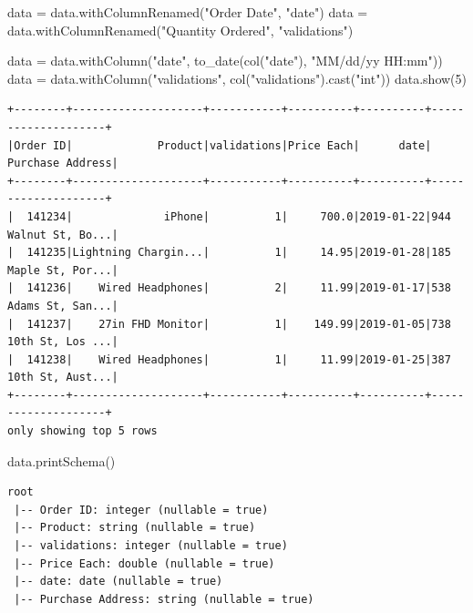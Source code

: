 \documentclass[
  letterpaper,
  DIV=11,
  numbers=noendperiod]{scrartcl}
\newenvironment{Shaded}{\begin{snugshade}}{\end{snugshade}}
\newcommand{\DecValTok}[1]{\textcolor[rgb]{0.68,0.00,0.00}{#1}}
\newcommand{\NormalTok}[1]{\textcolor[rgb]{0.00,0.23,0.31}{#1}}
\newcommand{\OperatorTok}[1]{\textcolor[rgb]{0.37,0.37,0.37}{#1}}
\newcommand{\StringTok}[1]{\textcolor[rgb]{0.13,0.47,0.30}{#1}}
\begin{document}
\begin{Shaded}
\begin{Highlighting}[]
\NormalTok{data }\OperatorTok{=}\NormalTok{ data.withColumnRenamed(}\StringTok{"Order Date"}\NormalTok{, }\StringTok{"date"}\NormalTok{)}
\NormalTok{data }\OperatorTok{=}\NormalTok{ data.withColumnRenamed(}\StringTok{"Quantity Ordered"}\NormalTok{, }\StringTok{"validations"}\NormalTok{)}
\end{Highlighting}
\end{Shaded}

\begin{Shaded}
\begin{Highlighting}[]
\NormalTok{data }\OperatorTok{=}\NormalTok{ data.withColumn(}\StringTok{"date"}\NormalTok{, to\_date(col(}\StringTok{"date"}\NormalTok{), }\StringTok{"MM/dd/yy HH:mm"}\NormalTok{))}
\NormalTok{data }\OperatorTok{=}\NormalTok{ data.withColumn(}\StringTok{"validations"}\NormalTok{, col(}\StringTok{"validations"}\NormalTok{).cast(}\StringTok{"int"}\NormalTok{))}
\NormalTok{data.show(}\DecValTok{5}\NormalTok{)}
\end{Highlighting}
\end{Shaded}

\begin{verbatim}
+--------+--------------------+-----------+----------+----------+--------------------+
|Order ID|             Product|validations|Price Each|      date|    Purchase Address|
+--------+--------------------+-----------+----------+----------+--------------------+
|  141234|              iPhone|          1|     700.0|2019-01-22|944 Walnut St, Bo...|
|  141235|Lightning Chargin...|          1|     14.95|2019-01-28|185 Maple St, Por...|
|  141236|    Wired Headphones|          2|     11.99|2019-01-17|538 Adams St, San...|
|  141237|    27in FHD Monitor|          1|    149.99|2019-01-05|738 10th St, Los ...|
|  141238|    Wired Headphones|          1|     11.99|2019-01-25|387 10th St, Aust...|
+--------+--------------------+-----------+----------+----------+--------------------+
only showing top 5 rows
\end{verbatim}

\begin{Shaded}
\begin{Highlighting}[]
\NormalTok{data.printSchema()}
\end{Highlighting}
\end{Shaded}

\begin{verbatim}
root
 |-- Order ID: integer (nullable = true)
 |-- Product: string (nullable = true)
 |-- validations: integer (nullable = true)
 |-- Price Each: double (nullable = true)
 |-- date: date (nullable = true)
 |-- Purchase Address: string (nullable = true)
\end{verbatim}
\end{document}
